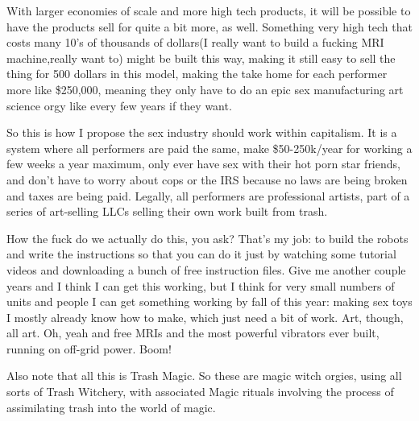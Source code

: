 With larger economies of scale and more high tech products, it will be
possible to have the products sell for quite a bit more, as well.
Something very high tech that costs many 10's of thousands of dollars(I
really want to build a fucking MRI machine,really want to) might be
built this way, making it still easy to sell the thing for 500 dollars
in this model, making the take home for each performer more like
\$250,000, meaning they only have to do an epic sex manufacturing art
science orgy like every few years if they want.

So this is how I propose the sex industry should work within capitalism.
It is a system where all performers are paid the same, make
\$50-250k/year for working a few weeks a year maximum, only ever have
sex with their hot porn star friends, and don't have to worry about cops
or the IRS because no laws are being broken and taxes are being paid.
Legally, all performers are professional artists, part of a series of
art-selling LLCs selling their own work built from trash.

How the fuck do we actually do this, you ask? That's my job: to build
the robots and write the instructions so that you can do it just by
watching some tutorial videos and downloading a bunch of free
instruction files. Give me another couple years and I think I can get
this working, but I think for very small numbers of units and people I
can get something working by fall of this year: making sex toys I mostly
already know how to make, which just need a bit of work. Art, though,
all art. Oh, yeah and free MRIs and the most powerful vibrators ever
built, running on off-grid power. Boom!

Also note that all this is Trash Magic. So these are magic witch orgies,
using all sorts of Trash Witchery, with associated Magic rituals
involving the process of assimilating trash into the world of magic.
